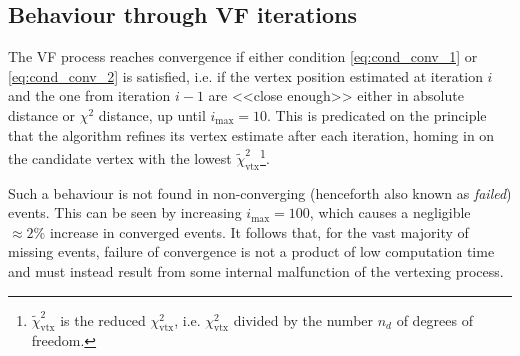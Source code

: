 \subsection{Behaviour through VF iterations}
\label{sec:oscillation}
The VF process reaches convergence if either condition \eqref{eq:cond_conv_1} or \eqref{eq:cond_conv_2} is satisfied, i.e. if the vertex position estimated at iteration $i$ and the one from iteration $i-1$ are <<close enough>> either in absolute distance or $\chi^2$ distance, up until $i_\text{max} = 10$.
This is predicated on the principle that the algorithm refines its vertex estimate after each iteration, homing in on the candidate vertex with the lowest $\tilde{\chi}^2_\text{vtx}$\footnote{$\tilde{\chi}^2_\text{vtx}$ is the reduced $\chi^2_\text{vtx}$, i.e. $\chi^2_\text{vtx}$ divided by the number $n_d$ of degrees of freedom.}.

Such a behaviour is not found in non-converging (henceforth also known as \textit{failed}) events.
This can be seen by increasing $i_\text{max}=100$, which causes a negligible $\approx 2\%$ increase in converged events.
It follows that, for the vast majority of missing events, failure of convergence is not a product of low computation time and must instead result from some internal malfunction of the vertexing process.


